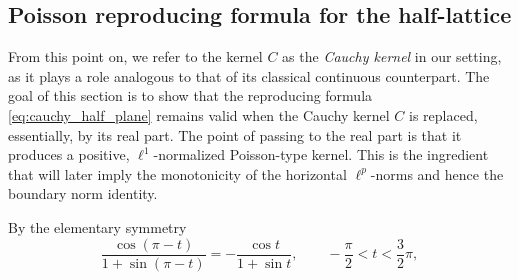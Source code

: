 \documentclass[12pt,a4paper,reqno]{amsart}
\theoremstyle{definition}
\theoremstyle{definition}\newtheorem{defn}[thm]{Definition}
\begin{document}
    \subsection{Poisson reproducing formula for the half-lattice}
    
      From this point on, we refer to the kernel $C$ as the \emph{Cauchy kernel} in our setting, as it plays a role analogous to that of its classical continuous counterpart. The goal of this section is to show that the reproducing formula \eqref{eq:cauchy_half_plane} remains valid when the Cauchy kernel $C$ is replaced, essentially, by its real part. The point of passing to the real part is that it produces a positive,
    $\ell^1$-normalized Poisson-type kernel. This is the ingredient that will later
    imply the monotonicity of the horizontal $\ell^p$-norms and hence the boundary
    norm identity.
      
      
      By the elementary symmetry
    \begin{equation}\label{Eq:symmetryphi}
    \frac{\cos (\pi-t)}{1+\sin (\pi-t)}=-\frac{\cos t}{1+\sin t}, \qquad -\frac{\pi}{2}<t<\frac{3}{2}\pi,
    \end{equation}
    
\end{document}
